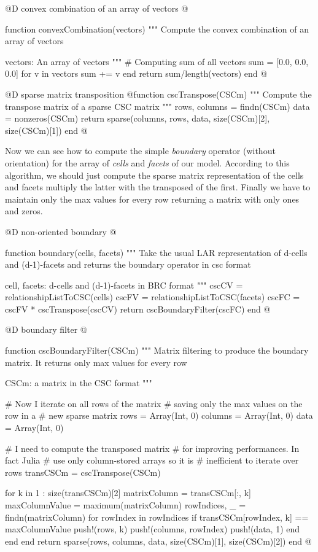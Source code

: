 \documentclass[11pt,oneside]{article}	%
\begin{document}
@D convex combination of an array of vectors
@{function convexCombination(vectors)
  """
  Compute the convex combination of an
  array of vectors

  vectors: An array of vectors
  """
  # Computing sum of all vectors
  sum = [0.0, 0.0, 0.0]
  for v in vectors
    sum += v
  end
  return sum/length(vectors)
end @}

@D sparse matrix transposition
@{function cscTranspose(CSCm)
  """
  Compute the transpose matrix of a
  sparse CSC matrix
  """
  rows, columns = findn(CSCm)
  data = nonzeros(CSCm)
  return sparse(columns, rows, data, size(CSCm)[2], size(CSCm)[1])
end @}

Now we can see how to compute the simple \textit{boundary} operator (without orientation) for the array of \textit{cells} and \textit{facets} of our model. According to this algorithm, we should just compute the sparse matrix representation of the cells and facets multiply the latter with the transposed of the first. Finally we have to maintain only the max values for every row returning a matrix with only ones and zeros.

@D non-oriented boundary
@{function boundary(cells, facets)
  """
  Take the usual LAR representation of d-cells
  and (d-1)-facets and returns the
  boundary operator in csc format

  cell, facets: d-cells and (d-1)-facets in BRC format
  """
  cscCV = relationshipListToCSC(cells)
  cscFV = relationshipListToCSC(facets)
  cscFC = cscFV * cscTranspose(cscCV)
  return cscBoundaryFilter(cscFC)
end @}

@D boundary filter
@{function cscBoundaryFilter(CSCm)
  """
  Matrix filtering to produce the boundary
  matrix. It returns only max values for
  every row

  CSCm: a matrix in the CSC format
  """

  # Now I iterate on all rows of the matrix
  # saving only the max values on the row in a
  # new sparse matrix
  rows = Array(Int, 0)
  columns = Array(Int, 0)
  data = Array(Int, 0)
  
  # I need to compute the transposed matrix
  # for improving performances. In fact Julia
  # use only column-stored arrays so it is
  # inefficient to iterate over rows
  transCSCm = cscTranspose(CSCm)

  for k in 1 : size(transCSCm)[2]
    matrixColumn = transCSCm[:, k]
    maxColumnValue = maximum(matrixColumn)
    rowIndices, _ = findn(matrixColumn)
    for rowIndex in rowIndices
      if transCSCm[rowIndex, k] == maxColumnValue
        push!(rows, k)
        push!(columns, rowIndex)
        push!(data, 1)
      end
    end
  end
  return sparse(rows, columns, data, size(CSCm)[1], size(CSCm)[2])
end @}
\end{document}
